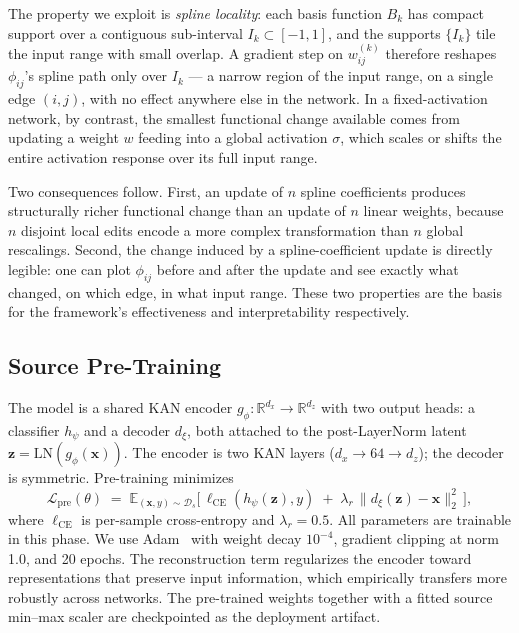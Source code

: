 \documentclass[10pt, conference, letterpaper]{IEEEtran}
\begin{document}
The property we exploit is \emph{spline locality}: each basis function $B_k$ has compact support over a contiguous sub-interval $I_k \subset [-1, 1]$, and the supports $\{I_k\}$ tile the input range with small overlap. A gradient step on $w_{ij}^{(k)}$ therefore reshapes $\phi_{ij}$'s spline path only over $I_k$ --- a narrow region of the input range, on a single edge $(i,j)$, with no effect anywhere else in the network. In a fixed-activation network, by contrast, the smallest functional change available comes from updating a weight $w$ feeding into a global activation $\sigma$, which scales or shifts the entire activation response over its full input range.

Two consequences follow. First, an update of $n$ spline coefficients produces structurally richer functional change than an update of $n$ linear weights, because $n$ disjoint local edits encode a more complex transformation than $n$ global rescalings. Second, the change induced by a spline-coefficient update is directly legible: one can plot $\phi_{ij}$ before and after the update and see exactly what changed, on which edge, in what input range. These two properties are the basis for the framework's effectiveness and interpretability respectively.

\subsection{Source Pre-Training}
\label{sec:pretrain}

The model is a shared KAN encoder $g_\phi : \mathbb{R}^{d_x} \to \mathbb{R}^{d_z}$ with two output heads: a classifier $h_\psi$ and a decoder $d_\xi$, both attached to the post-LayerNorm latent $\mathbf{z} = \mathrm{LN}\!\left(g_\phi(\mathbf{x})\right)$. The encoder is two KAN layers ($d_x \to 64 \to d_z$); the decoder is symmetric. Pre-training minimizes
\begin{equation}
\label{eq:pretrain}
\mathcal{L}_{\text{pre}}(\theta) \;=\; \mathbb{E}_{(\mathbf{x}, y) \sim \mathcal{D}_s}\Big[\, \ell_{\text{CE}}\!\left(h_\psi(\mathbf{z}), y\right) \;+\; \lambda_r \,\|d_\xi(\mathbf{z}) - \mathbf{x}\|_2^2 \,\Big],
\end{equation}
where $\ell_{\text{CE}}$ is per-sample cross-entropy and $\lambda_r = 0.5$. All parameters are trainable in this phase. We use Adam~\cite{kingma2015adam} with weight decay $10^{-4}$, gradient clipping at norm 1.0, and 20 epochs. The reconstruction term regularizes the encoder toward representations that preserve input information, which empirically transfers more robustly across networks. The pre-trained weights together with a fitted source min--max scaler are checkpointed as the deployment artifact.
\end{document}
